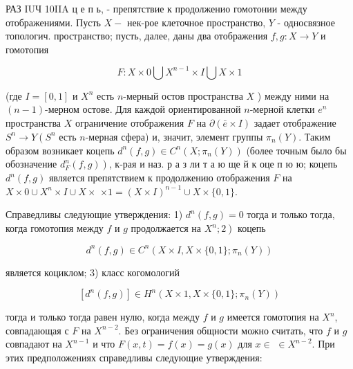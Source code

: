 \documentclass[10pt]{article}
\begin{document}
РАЗ IUЧ 10IIA ц е п ь, - препятствие к продолженио гомотонии между отображениями. Пусть $X-$ нек-рое клеточное пространство, $Y$ - односвязное топологич. пространство; пусть, далее, даны два отображения $f, g: X \rightarrow Y$ и гомотопия



\[

F: X \times 0 \bigcup X^{n-1} \times I \bigcup X \times 1

\]



(где $I=[0,1]$ и $X^{n}$ есть $n$-мерный остов пространства $X$ ) между ними на $(n-1)$-мерном остове. Для каждой ориентированной $n$-мерной клетки $e^{n}$ пространства $X$ ограничение отображения $F$ на $\partial(\bar{e} \times I)$ задает отображение $S^{n} \rightarrow Y\left(S^{n}\right.$ есть $n$-мерная сфера) и, значит, элемент группы $\pi_{n}(Y)$. Таким образом возникает коцепь $d^{n}(f, g) \in C^{n}\left(X ; \pi_{n}(Y)\right)$ (более точным было бы обозначение $\left.d_{F}^{n}(f, g)\right)$, к-рая и наз. р а з ли т а ю ще й к оце п ю ю; коцепь $d^{n}(f, g)$ является препятствием к продолжению отображения $F$ на $X \times 0 \cup X^{n} \times I \cup X \times$ $\times 1=(X \times I)^{n-1} \cup X \times\{0,1\}$.



Справедливы следующие утверждения: 1) $d^{n}(f, g)=0$ тогда и только тогда, когда гомотопия между $f$ и $g$ продолжается на $\left.X^{n} ; 2\right)$ коцепь



\[

d^{n}(f, g) \in C^{n}\left(X \times I, X \times\{0,1\} ; \pi_{n}(Y)\right)

\]



является коциклом; 3) класс когомологий



\[

\left[d^{n}(f, g)\right] \in H^{n}\left(X \times 1, X \times\{0,1\} ; \pi_{n}(Y)\right)

\]



тогда и только тогда равен нулю, когда между $f$ и $g$ имеется гомотопия на $X^{n}$, совпадающая с $F$ на $X^{n-2}$. Без ограничения общности можно считать, что $f$ и $g$ совпадают на $X^{n-1}$ и что $F(x, t)=f(x)=g(x)$ для $x \in$ $\in X^{n-2}$. При этих предположениях справедливы следующие утверждения:
\end{document}
